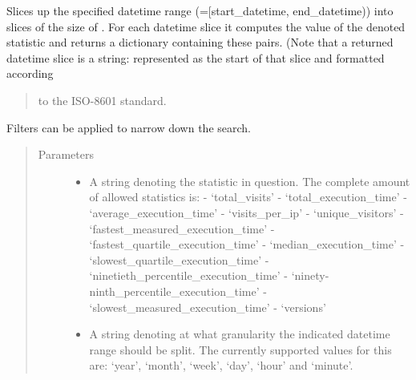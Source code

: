 \documentclass[letterpaper,10pt,english]{sphinxmanual}
\begin{document}
\begin{fulllineitems}
\begin{fulllineitems}
\begin{quote}
\begin{description}
\begin{itemize}
\end{itemize}

\end{description}\end{quote}

\end{fulllineitems}


\begin{fulllineitems}
\label{\detokenize{pydash_app.dashboard.endpoint:pydash_app.dashboard.endpoint.Endpoint.statistic_per_timeslice}}
Slices up the specified datetime range (={[}start\_datetime, end\_datetime)) into slices of the size of .
For each datetime slice it computes the value of the denoted statistic and returns a dictionary containing these pairs.
(Note that a returned datetime slice is a string: represented as the start of that slice and formatted according
\begin{quote}

to the ISO-8601 standard.
\end{quote}

Filters can be applied to narrow down the search.
\begin{quote}\begin{description}
\item[{Parameters}] \leavevmode\begin{itemize}
\item {} 
 \textendash{} A string denoting the statistic in question. The complete amount of allowed statistics is:
- ‘total\_visits’
- ‘total\_execution\_time’
- ‘average\_execution\_time’
- ‘visits\_per\_ip’
- ‘unique\_visitors’
- ‘fastest\_measured\_execution\_time’
- ‘fastest\_quartile\_execution\_time’
- ‘median\_execution\_time’
- ‘slowest\_quartile\_execution\_time’
- ‘ninetieth\_percentile\_execution\_time’
- ‘ninety-ninth\_percentile\_execution\_time’
- ‘slowest\_measured\_execution\_time’
- ‘versions’

\item {} 
 \textendash{} A string denoting at what granularity the indicated datetime range should be split.
The currently supported values for this are: ‘year’, ‘month’, ‘week’, ‘day’, ‘hour’ and ‘minute’.


\end{itemize}
\end{description}
\end{quote}
\end{fulllineitems}
\end{fulllineitems}
\end{document}
